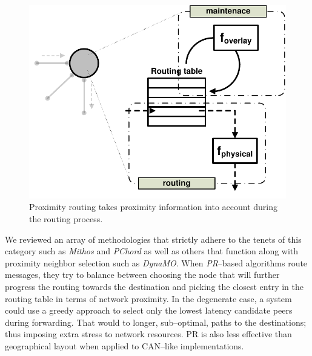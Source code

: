 \begin{figure}[ht]
\centering
  \includegraphics[scale=0.48]{img/pdf/proximity-routing.pdf}
\caption{Proximity routing takes proximity information into account during the
routing process.}
\label{figure:proximity-routing}
\end{figure}
We reviewed an array of methodologies that strictly adhere to 
the tenets of this category such as \emph{Mithos} and
\emph{PChord} as well as others that function along with 
proximity neighbor selection such as \emph{DynaMO}.
When \emph{PR}--based algorithms route messages, they try to balance between
choosing the node that will further progress the routing towards the
destination and picking the closest entry in the routing table
in terms of network proximity. 
In the degenerate case, a system could use a greedy approach to select
only the lowest latency candidate peers during forwarding. That would to
longer, sub--optimal, paths to the destinations; thus imposing
extra stress to network resources. PR is also less
effective than geographical layout when applied to CAN--like implementations.



